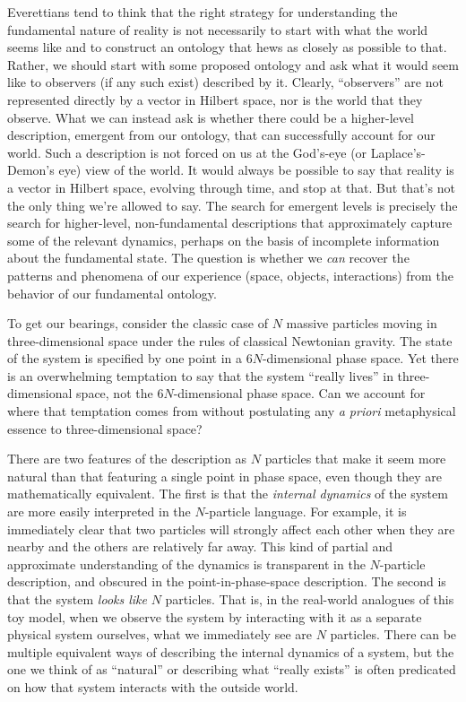\documentclass[12pt,english]{article}
\begin{document}
Everettians tend to think that the right strategy for understanding the fundamental nature of reality is not necessarily to start with what the world seems like and to construct an ontology that hews as closely as possible to that.
Rather, we should start with some proposed ontology and ask what it would seem like to observers (if any such exist) described by it.
Clearly, ``observers'' are not represented directly by a vector in Hilbert space, nor is the world that they observe.
What we can instead ask is whether there could be a higher-level description, emergent from our ontology, that can successfully account for our world.
Such a description is not forced on us at the God's-eye (or Laplace's-Demon's eye) view of the world.
It would always be possible to say that reality is a vector in Hilbert space, evolving through time, and stop at that.
But that's not the only thing we're allowed to say.
The search for emergent levels is precisely the search for higher-level, non-fundamental descriptions that approximately capture some of the relevant dynamics, perhaps on the basis of incomplete information about the fundamental state.
The question is whether we \emph{can} recover the patterns and phenomena of our experience (space, objects, interactions) from the behavior of our fundamental ontology.

To get our bearings, consider the classic case of $N$ massive particles moving in three-dimensional space under the rules of classical Newtonian gravity.
The state of the system is specified by one point in a $6N$-dimensional phase space.
Yet there is an overwhelming temptation to say that the system ``really lives'' in three-dimensional space, not the $6N$-dimensional phase space.
Can we account for where that temptation comes from without postulating any \emph{a priori} metaphysical essence to three-dimensional space?

There are two features of the description as $N$ particles that make it seem more natural than that featuring a single point in phase space, even though they are mathematically equivalent.
The first is that the \emph{internal dynamics} of the system are more easily interpreted in the $N$-particle language.
For example, it is immediately clear that two particles will strongly affect each other when they are nearby and the others are relatively far away. 
This kind of partial and approximate understanding of the dynamics is transparent in the $N$-particle description, and obscured in the point-in-phase-space description.
The second is that the system \emph{looks like} $N$ particles.
That is, in the real-world analogues of this toy model, when we observe the system by interacting with it as a separate physical system ourselves, what we immediately see are $N$ particles. 
There can be multiple equivalent ways of describing the internal dynamics of a system, but the one we think of as ``natural'' or describing what ``really exists'' is often predicated on how that system interacts with the outside world. 
\end{document}
